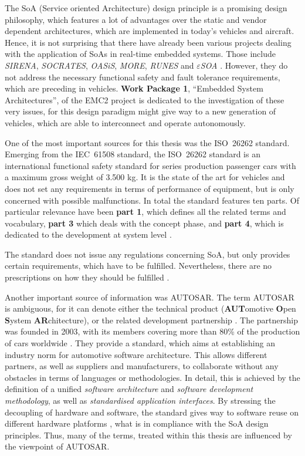 \label{ch:introduction}
The SoA (Service oriented Architecture) design principle is a promising design philosophy, which features a lot of advantages over the static and vendor dependent architectures, which are implemented in today's vehicles and aircraft. Hence, it is not surprising that there have already been various projects dealing with the application of SoAs in real-time embedded systems. Those include \emph{SIRENA}, \emph{SOCRATES}, \emph{OASiS}, \emph{MORE}, \emph{RUNES} and \emph{$\varepsilon$SOA} \cite{scholz} \cite{sommer} \cite{buckl}. However, they do not address the necessary functional safety and fault tolerance requirements, which are preceding in vehicles. \textbf{Work Package 1}, ``Embedded System Architectures'', of the EMC2 project is dedicated to the investigation of these very issues, for this design paradigm might give way to a new generation of vehicles, which are able to interconnect and operate autonomously.

One of the most important sources for this thesis was the \mbox{ISO 26262} standard. Emerging from the \mbox{IEC 61508} standard, the \mbox{ISO 26262} standard is an international functional safety standard for series production passenger cars with a maximum gross weight of 3.500 kg. It is the state of the art for vehicles and does not set any requirements in terms of performance of equipment, but is only concerned with possible malfunctions. In total the standard features ten parts. Of particular relevance have been \textbf{part 1}, which defines all the related terms and vocabulary, \textbf{part 3} which deals with the concept phase, and \textbf{part 4}, which is dedicated  to the development at system level \cite{iso26262:1} \cite{iso26262:3} \cite{iso26262:4}.

The standard does not issue any regulations concerning SoA, but only provides certain requirements, which have to be fulfilled. Nevertheless, there are no prescriptions on how they should be fulfilled \cite{iso26262:course1}.

Another important source of information was \mbox{AUTOSAR}. The term \mbox{AUTOSAR} is ambiguous, for it can denote either the technical product (\textbf{AUT}omotive \textbf{O}pen \textbf{S}ystem \textbf{AR}chitecture), or the related development partnership \cite{autosar_rs_main}. The partnership was founded in 2003, with its members covering more than 80\% of the production of cars worldwide \cite{kirschke_biller2011} \cite{schmerler2012}. They provide a standard, which aims at establishing an industry norm for automotive software architecture. This allows different partners, as well as suppliers and manufacturers, to collaborate without any obstacles in terms of languages or methodologies. In detail, this is achieved by the definition of a unified \emph{software architecture} and \emph{software development methodology}, as well as \emph{standardised application interfaces}. By stressing the decoupling of hardware and software, the standard gives way to software reuse on different hardware platforms \cite{kirschke_biller2011} \cite{schmerler2012}, what is in compliance with the SoA design principles. Thus, many of the terms, treated within this thesis are influenced by the viewpoint of \mbox{AUTOSAR}.
